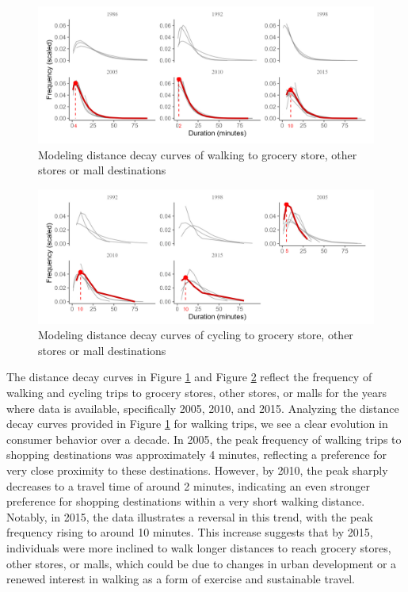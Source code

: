\documentclass[
11pt, %
oneside, %
english, %
singlespacing, %
]{macthesis} %
\begin{document}
\begin{landscape}

\begin{figure}

{\centering \includegraphics[width=0.9\linewidth]{figure/ch03-Fig09} 

}

\caption{Modeling distance decay curves of walking to grocery store, other stores or mall destinations}\label{fig:grocery-wi}
\end{figure}

\begin{figure}

{\centering \includegraphics[width=0.9\linewidth]{figure/ch03-Fig10} 

}

\caption{Modeling distance decay curves of cycling to grocery store, other stores or mall destinations}\label{fig:grocery-ci}
\end{figure}
\end{landscape}

The distance decay curves in Figure \ref{fig:grocery-wi} and Figure \ref{fig:grocery-ci} reflect the frequency of walking and cycling trips to grocery stores, other stores, or malls for the years where data is available, specifically 2005, 2010, and 2015. Analyzing the distance decay curves provided in Figure \ref{fig:grocery-wi} for walking trips, we see a clear evolution in consumer behavior over a decade. In 2005, the peak frequency of walking trips to shopping destinations was approximately 4 minutes, reflecting a preference for very close proximity to these destinations. However, by 2010, the peak sharply decreases to a travel time of around 2 minutes, indicating an even stronger preference for shopping destinations within a very short walking distance. Notably, in 2015, the data illustrates a reversal in this trend, with the peak frequency rising to around 10 minutes. This increase suggests that by 2015, individuals were more inclined to walk longer distances to reach grocery stores, other stores, or malls, which could be due to changes in urban development or a renewed interest in walking as a form of exercise and sustainable travel.
\end{document}
